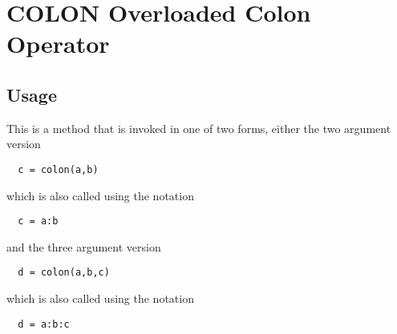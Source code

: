 \section{COLON Overloaded Colon Operator}

\subsection{Usage}

This is a method that is invoked in one of two forms, either
the two argument version
\begin{verbatim}
  c = colon(a,b)
\end{verbatim}
which is also called using the notation
\begin{verbatim}
  c = a:b
\end{verbatim}
and the three argument version
\begin{verbatim}
  d = colon(a,b,c)
\end{verbatim}
which is also called using the notation
\begin{verbatim}
  d = a:b:c
\end{verbatim}
